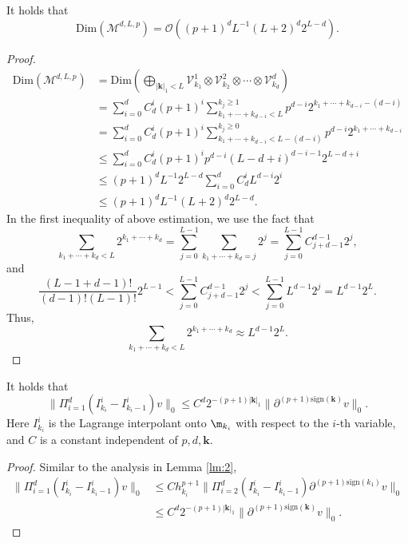 \begin{lemma}
It holds that 
\begin{equation}
\text{Dim}(\mathcal{M}^{d,L,p}) =\mathcal{O}\left( (p+1)^d L^{-1}(L+2)^d 2^{L-d}\right).
\end{equation}
\end{lemma}
\begin{proof}
\begin{equation}
\begin{aligned}
\text{Dim}(\mathcal{M}^{d,L,p})& = \text{Dim}(\bigoplus_{|\mathbf{k}|_1 < L} \mathcal V_{k_1}^1 \otimes  \mathcal V_{k_2}^2\otimes\cdots \otimes  \mathcal V_{k_d}^d )\\
& = \sum_{i=0}^d C_d^i (p+1)^i \sum_{k_1+\cdots +k_{d-i} <L}^{k_j \ge 1} p^{d-i}2^{k_1+\cdots+k_{d-i} -(d-i)} \\
& = \sum_{i=0}^d C_d^i (p+1)^i \sum_{k_1+\cdots +k_{d-i} <L-(d-i)}^{k_j \ge 0} p^{d-i}2^{k_1+\cdots+k_{d-i} } \\
& \le \sum_{i=0}^d  C_d^i    (p+1)^i p^{d-i} (L-d+i)^{d-i-1}2^{L-d+i}\\
&\le (p+1)^d L^{-1}2^{L-d} \sum_{i=0}^d C_d^i L^{d-i} 2^i\\
&\le (p+1)^d L^{-1}(L+2)^d 2^{L-d}.
\end{aligned}
\end{equation}
In the first inequality of above estimation, we use the fact that 
$$
\sum_{k_1+\cdots+k_d < L }2^{k_1+\cdots +k_d} = \sum_{j=0}^{L-1} \sum_{k_1+\cdots+k_d =j}2^j =  \sum_{j=0}^{L-1} C_{j+d-1}^{d-1}2^j,
$$
and 
$$
\frac{(L-1+d-1)!}{(d-1)!(L-1)!} 2^{L-1} < \sum_{j=0}^{L-1} C_{j+d-1}^{d-1}2^j <  \sum_{j=0}^{L-1} L^{d-1}2^j =L^{d-1}2^L.
$$
Thus,
$$
\sum_{k_1+\cdots+k_d < L }2^{k_1+\cdots +k_d} \approx  L^{d-1}2^L.
$$

\end{proof}

\begin{lemma}\label{lm:spare_grid_decay}
It holds that 
\begin{equation}
\|\Pi_{i=1}^d (I_{k_i}^i -I_{k_i-1}^i) v\|_0  \le C^{d} 2^{-(p+1)|\mathbf{k}|_1}\|\partial^{(p+1)\text{sign}(\mathbf{k})}v\|_0.
\end{equation}
Here $I_{k_i}^i$ is the Lagrange interpolant onto $\m_{k_i}$ with respect to the $i$-th variable, and $C$ is a constant independent of $p,d,\mathbf{k}$.
\end{lemma}
\begin{proof}
Similar to the analysis in Lemma \ref{lm:2},
\begin{equation}
\begin{aligned}
\|\Pi_{i=1}^d (I_{k_i}^i -I_{k_i-1}^i) v\|_0  &\le Ch_{k_i}^{p+1} \|\Pi_{i=2}^d (I_{k_i}^i -I_{k_i-1}^i)  \partial^{(p+1)\text{sign}(k_1)}v \|_0\\
&\le C^{d} 2^{-(p+1)|\mathbf{k}|_1}\|\partial^{(p+1)\text{sign}(\mathbf{k})}v\|_0.
\end{aligned}
\end{equation}
\end{proof}

